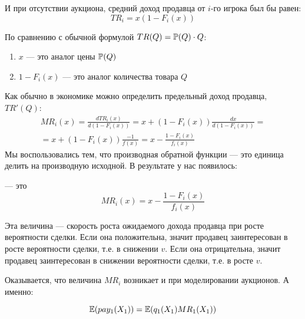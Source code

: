 И при отсутствии аукциона, средний доход продавца от $ i $-го игрока был бы равен:
\begin{equation}
TR_{i}=x(1-F_{i}(x))
\end{equation}

По сравнению с обычной формулой $ TR(Q)=\P(Q)\cdot Q $:
\begin{enumerate}
\item $ x $ --- это аналог цены $ \P(Q) $
\item $ 1-F_{i}(x) $ --- это аналог количества товара $ Q $
\end{enumerate}

Как обычно в экономике можно определить предельный доход продавца, $ TR'(Q) $:
\begin{multline}
MR_{i}(x)=\frac{d TR_{i}(x)}{d(1-F_{i}(x))}=x+(1-F_{i}(x))\frac{dx}{d(1-F_{i}(x))}=\\
=x+(1-F_{i}(x))\frac{-1}{f(x)}=x-\frac{1-F_{i}(x)}{f_{i}(x)}
\end{multline}
Мы воспользовались тем, что производная обратной функции --- это единица делить на производную исходной. 
В результате у нас появилось:
\begin{mydef}
 --- это 
\begin{equation}
MR_{i}(x)=x-\frac{1-F_{i}(x)}{f_{i}(x)}
\end{equation}
\end{mydef}

Эта величина --- скорость роста ожидаемого дохода продавца при росте вероятности сделки. Если она положительна, значит продавец заинтересован в росте вероятности сделки, т.е. в снижении $ v $. Если она отрицательна, значит продавец заинтересован в снижении вероятности сделки, т.е. в росте $ v $.

Оказывается, что величина $ MR_{i} $ возникает и при моделировании аукционов. А именно:

\begin{myth}
\begin{equation}
\E(pay_{1}(X_{1}))=\E(q_{1}(X_{1})MR_{1}(X_{1}))
\end{equation}
\end{myth}

